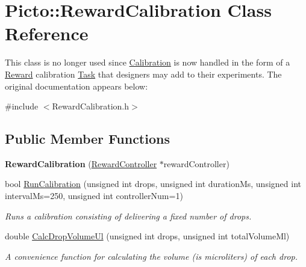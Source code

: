 \hypertarget{class_picto_1_1_reward_calibration}{\section{Picto\-:\-:Reward\-Calibration Class Reference}
\label{class_picto_1_1_reward_calibration}
}


This class is no longer used since \hyperlink{class_picto_1_1_calibration}{Calibration} is now handled in the form of a \hyperlink{class_picto_1_1_reward}{Reward} calibration \hyperlink{class_picto_1_1_task}{Task} that designers may add to their experiments. The original documentation appears below\-:  




{\ttfamily \#include $<$Reward\-Calibration.\-h$>$}

\subsection*{Public Member Functions}
\begin{DoxyCompactItemize}
\item 
\hypertarget{class_picto_1_1_reward_calibration_a6865352023d9bd139d7ebea225985546}{{\bfseries Reward\-Calibration} (\hyperlink{class_picto_1_1_reward_controller}{Reward\-Controller} $\ast$reward\-Controller)}\label{class_picto_1_1_reward_calibration_a6865352023d9bd139d7ebea225985546}

\item 
bool \hyperlink{class_picto_1_1_reward_calibration_aa1a9f5871751a6bc6eb2f99882fbf847}{Run\-Calibration} (unsigned int drops, unsigned int duration\-Ms, unsigned int interval\-Ms=250, unsigned int controller\-Num=1)
\begin{DoxyCompactList}\small\item\em Runs a calibration consisting of delivering a fixed number of drops. \end{DoxyCompactList}\item 
\hypertarget{class_picto_1_1_reward_calibration_adcd56c6d5a9cdf999bd78272687ecd2a}{double \hyperlink{class_picto_1_1_reward_calibration_adcd56c6d5a9cdf999bd78272687ecd2a}{Calc\-Drop\-Volume\-Ul} (unsigned int drops, unsigned int total\-Volume\-Ml)}\label{class_picto_1_1_reward_calibration_adcd56c6d5a9cdf999bd78272687ecd2a}

\begin{DoxyCompactList}\small\item\em A convenience function for calculating the volume (is microliters) of each drop. \end{DoxyCompactList}\end{DoxyCompactItemize}


